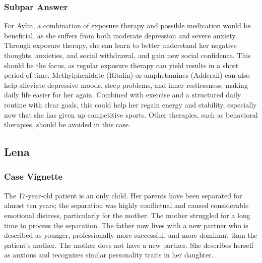 \subsubsection{Subpar Answer}
For Aylin, a combination of exposure therapy and possible medication would be beneficial, as she suffers from both moderate depression and severe anxiety.
Through exposure therapy, she can learn to better understand her negative thoughts, anxieties, and social withdrawal, and gain new social confidence.
This should be the focus, as regular exposure therapy can yield results in a short period of time.
Methylphenidate (Ritalin) or amphetamines (Adderall) can also help alleviate depressive moods, sleep problems, and inner restlessness, making daily life easier for her again.
Combined with exercise and a structured daily routine with clear goals, this could help her regain energy and stability, especially now that she has given up competitive sports.
Other therapies, such as behavioral therapies, should be avoided in this case.

\subsection{Lena \autocite[slide~26]{dbjr_stoerungsbilder}}
\label{app:LenaFull}
\subsubsection{Case Vignette}
The 17-year-old patient is an only child.
Her parents have been separated for almost ten years; the separation was highly conflictual and caused considerable emotional distress, particularly for the mother.
The mother struggled for a long time to process the separation.
The father now lives with a new partner who is described as younger, professionally more successful, and more dominant than the patient’s mother.
The mother does not have a new partner.
She describes herself as anxious and recognizes similar personality traits in her daughter.

